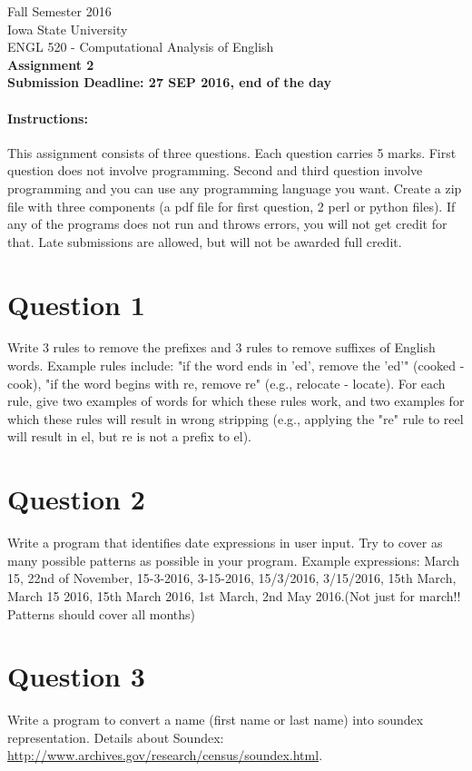 \documentclass[11pt,a4paper]{article}
\begin{document}
\begin{center}
  Fall Semester 2016 \\ Iowa State University\\[3ex]
  {\large ENGL 520 - Computational Analysis of English}\\[3ex]
  \textbf{Assignment 2} \\ \textbf{Submission Deadline: 27 SEP 2016, end of the day}
\end{center}


\paragraph{Instructions:} This assignment consists of three questions. Each question carries 5 marks. First question does not involve programming. Second and third question involve programming and you can use any programming language you want. Create a zip file with three components (a pdf file for first question, 2 perl or python files). If any of the programs does not run and throws errors, you will not get credit for that. Late submissions are allowed, but will not be awarded full credit.

\section*{Question 1} 
Write 3 rules to remove the prefixes and 3 rules to remove suffixes of English words. Example rules include: "if the word ends in 'ed', remove the 'ed'" (cooked - cook), "if the word begins with re, remove re" (e.g., relocate - locate). For each rule, give two examples of words for which these rules work, and two examples for which these rules will result in wrong stripping (e.g., applying the "re" rule to reel will result in el, but re is not a prefix to el).

\section*{Question 2}
Write a program that identifies date expressions in user input. Try to cover as many possible patterns as possible in your program.
Example expressions: March 15, 22nd of November, 15-3-2016, 3-15-2016, 15/3/2016, 3/15/2016, 15th March, March 15 2016, 15th March 2016, 1st March, 2nd May 2016.(Not just for march!! Patterns should cover all months)

\section*{Question 3}
Write a program to convert a name (first name or last name) into soundex representation. Details about Soundex: \url{http://www.archives.gov/research/census/soundex.html}. 
\end{document}
